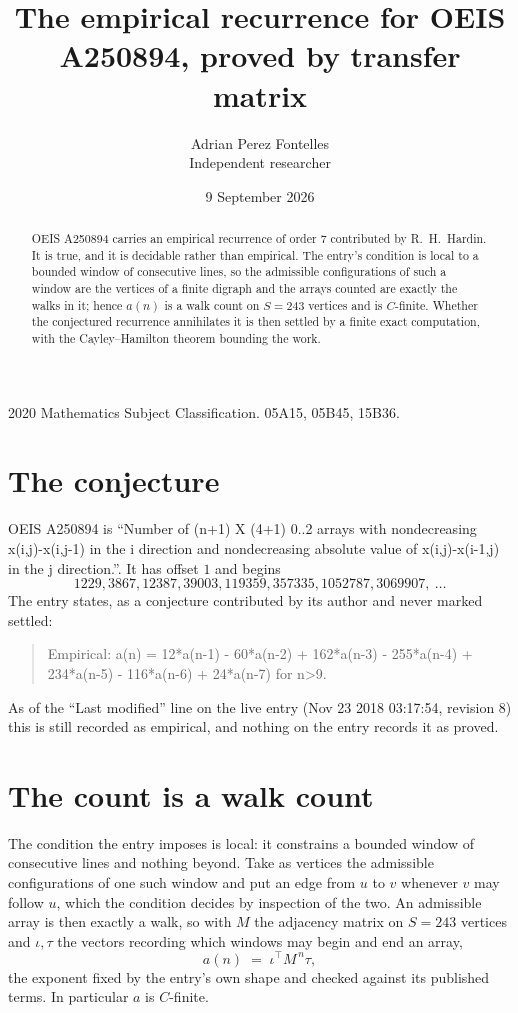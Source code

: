 \documentclass[11pt,a4paper]{article}
\title{The empirical recurrence for OEIS A250894, proved by transfer matrix}
\author{Adrian Perez Fontelles\\ \small Independent researcher}
\date{9 September 2026}
\theoremstyle{plain}
\theoremstyle{definition}
\begin{document}
\maketitle

\begin{abstract}
OEIS A250894 carries an empirical recurrence of order $7$ contributed by R.~H.~Hardin. It is
true, and it is decidable rather than empirical. The entry's condition is local to a bounded window of consecutive lines, so
the admissible configurations of such a window are the vertices of a finite digraph and the
arrays counted are exactly the walks in it; hence $a(n)$ is a walk count on $S=243$ vertices
and is $C$-finite. Whether the conjectured recurrence annihilates it is then settled by a
finite exact computation, with the Cayley--Hamilton theorem bounding the work.
\end{abstract}

\noindent\small 2020 Mathematics Subject Classification. 05A15, 05B45, 15B36.\normalsize

\section{The conjecture}

OEIS A250894 is ``Number of (n+1) X (4+1) 0..2 arrays with nondecreasing x(i,j)-x(i,j-1) in the i direction and nondecreasing absolute value of x(i,j)-x(i-1,j) in the j direction.''. It has offset $1$ and begins
\[
1229, 3867, 12387, 39003, 119359, 357335, 1052787, 3069907,\ \dots
\]
The entry states, as a conjecture contributed by its author and never marked settled:
\begin{quote}
Empirical: a(n) = 12*a(n-1) - 60*a(n-2) + 162*a(n-3) - 255*a(n-4) + 234*a(n-5) - 116*a(n-6) + 24*a(n-7) for n>9.
\end{quote}
As of the ``Last modified'' line on the live entry (Nov 23 2018 03:17:54, revision 8) this is still
recorded as empirical, and nothing on the entry records it as proved.

\section{The count is a walk count}

The condition the entry imposes is local: it constrains a bounded window of consecutive lines and nothing beyond. Take as
vertices the admissible configurations of one such window and put an edge from $u$ to $v$
whenever $v$ may follow $u$, which the condition decides by inspection of the two. An
admissible array is then exactly a walk, so with $M$ the adjacency matrix on $S=243$ vertices
and $\iota,\tau$ the vectors recording which windows may begin and end an array,
\[
a(n)\;=\;\iota^{\!\top}M^{\,n}\tau ,
\]
the exponent fixed by the entry's own shape and checked against its published terms. In
particular $a$ is $C$-finite.
\end{document}
